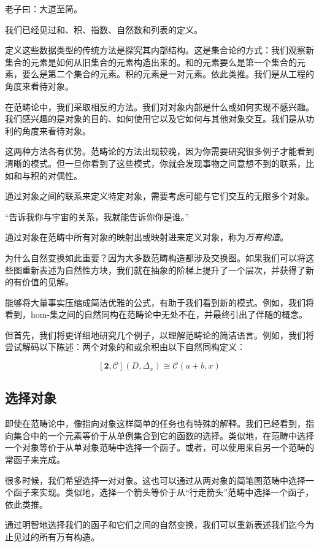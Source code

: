 \documentclass[DaoFP]{subfiles}
\begin{document}
老子曰：大道至简。

我们已经见过和、积、指数、自然数和列表的定义。

定义这些数据类型的传统方法是探究其内部结构。这是集合论的方式：我们观察新集合的元素是如何从旧集合的元素构造出来的。和的元素要么是第一个集合的元素，要么是第二个集合的元素。积的元素是一对元素。依此类推。我们是从工程的角度来看待对象。

在范畴论中，我们采取相反的方法。我们对对象内部是什么或如何实现不感兴趣。我们感兴趣的是对象的目的、如何使用它以及它如何与其他对象交互。我们是从功利的角度来看待对象。

这两种方法各有优势。范畴论的方法出现较晚，因为你需要研究很多例子才能看到清晰的模式。但一旦你看到了这些模式，你就会发现事物之间意想不到的联系，比如和与积的对偶性。

通过对象之间的联系来定义特定对象，需要考虑可能与它们交互的无限多个对象。

“告诉我你与宇宙的关系，我就能告诉你你是谁。”

通过对象在范畴中所有对象的映射出或映射进来定义对象，称为\emph{万有构造}。

为什么自然变换如此重要？因为大多数范畴构造都涉及交换图。如果我们可以将这些图重新表述为自然性方块，我们就在抽象的阶梯上提升了一个层次，并获得了新的有价值的见解。

能够将大量事实压缩成简洁优雅的公式，有助于我们看到新的模式。例如，我们将看到，hom-集之间的自然同构在范畴论中无处不在，并最终引出了伴随的概念。

但首先，我们将更详细地研究几个例子，以理解范畴论的简洁语言。例如，我们将尝试解码以下陈述：两个对象的和或余积由以下自然同构定义：

\[ [\mathbf{2}, \mathcal{C}](D, \Delta_x)  \cong \mathcal{C}(a + b, x) \]

\subsection{选择对象}

即使在范畴论中，像指向对象这样简单的任务也有特殊的解释。我们已经看到，指向集合中的一个元素等价于从单例集合到它的函数的选择。类似地，在范畴中选择一个对象等价于从单对象范畴中选择一个函子。或者，可以使用来自另一个范畴的常函子来完成。

很多时候，我们希望选择一对对象。这也可以通过从两对象的简笔图范畴中选择一个函子来实现。类似地，选择一个箭头等价于从“行走箭头”范畴中选择一个函子，依此类推。

通过明智地选择我们的函子和它们之间的自然变换，我们可以重新表述我们迄今为止见过的所有万有构造。
\end{document}
